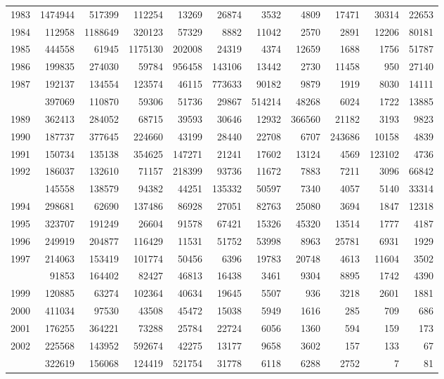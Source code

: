 \documentclass[
]{article}
\begin{document}
\begin{longtable}[t]{lrrrrrrrrrr}
1983 & 1474944 & 517399 & 112254 & 13269 & 26874 & 3532 & 4809 & 17471 & 30314 & 22653\\
1984 & 112958 & 1188649 & 320123 & 57329 & 8882 & 11042 & 2570 & 2891 & 12206 & 80181\\
1985 & 444558 & 61945 & 1175130 & 202008 & 24319 & 4374 & 12659 & 1688 & 1756 & 51787\\
1986 & 199835 & 274030 & 59784 & 956458 & 143106 & 13442 & 2730 & 11458 & 950 & 27140\\
1987 & 192137 & 134554 & 123574 & 46115 & 773633 & 90182 & 9879 & 1919 & 8030 & 14111\\
\addlinespace
1988 & 397069 & 110870 & 59306 & 51736 & 29867 & 514214 & 48268 & 6024 & 1722 & 13885\\
1989 & 362413 & 284052 & 68715 & 39593 & 30646 & 12932 & 366560 & 21182 & 3193 & 9823\\
1990 & 187737 & 377645 & 224660 & 43199 & 28440 & 22708 & 6707 & 243686 & 10158 & 4839\\
1991 & 150734 & 135138 & 354625 & 147271 & 21241 & 17602 & 13124 & 4569 & 123102 & 4736\\
1992 & 186037 & 132610 & 71157 & 218399 & 93736 & 11672 & 7883 & 7211 & 3096 & 66842\\
\addlinespace
1993 & 145558 & 138579 & 94382 & 44251 & 135332 & 50597 & 7340 & 4057 & 5140 & 33314\\
1994 & 298681 & 62690 & 137486 & 86928 & 27051 & 82763 & 25080 & 3694 & 1847 & 12318\\
1995 & 323707 & 191249 & 26604 & 91578 & 67421 & 15326 & 45320 & 13514 & 1777 & 4187\\
1996 & 249919 & 204877 & 116429 & 11531 & 51752 & 53998 & 8963 & 25781 & 6931 & 1929\\
1997 & 214063 & 153419 & 101774 & 50456 & 6396 & 19783 & 20748 & 4613 & 11604 & 3502\\
\addlinespace
1998 & 91853 & 164402 & 82427 & 46813 & 16438 & 3461 & 9304 & 8895 & 1742 & 4390\\
1999 & 120885 & 63274 & 102364 & 40634 & 19645 & 5507 & 936 & 3218 & 2601 & 1881\\
2000 & 411034 & 97530 & 43508 & 45472 & 15038 & 5949 & 1616 & 285 & 709 & 686\\
2001 & 176255 & 364221 & 73288 & 25784 & 22724 & 6056 & 1360 & 594 & 159 & 173\\
2002 & 225568 & 143952 & 592674 & 42275 & 13177 & 9658 & 3602 & 157 & 133 & 67\\
\addlinespace
2003 & 322619 & 156068 & 124419 & 521754 & 31778 & 6118 & 6288 & 2752 & 7 & 81\\

\end{longtable}
\end{document}
